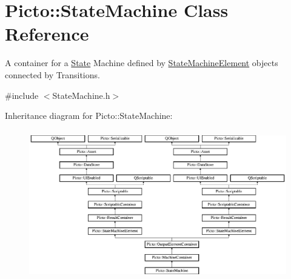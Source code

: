\hypertarget{class_picto_1_1_state_machine}{\section{Picto\-:\-:State\-Machine Class Reference}
\label{class_picto_1_1_state_machine}
}


A container for a \hyperlink{class_picto_1_1_state}{State} Machine defined by \hyperlink{class_picto_1_1_state_machine_element}{State\-Machine\-Element} objects connected by Transitions.  




{\ttfamily \#include $<$State\-Machine.\-h$>$}

Inheritance diagram for Picto\-:\-:State\-Machine\-:\begin{figure}[H]
\begin{center}
\leavevmode
\includegraphics[height=6.484210cm]{class_picto_1_1_state_machine}
\end{center}
\end{figure}
